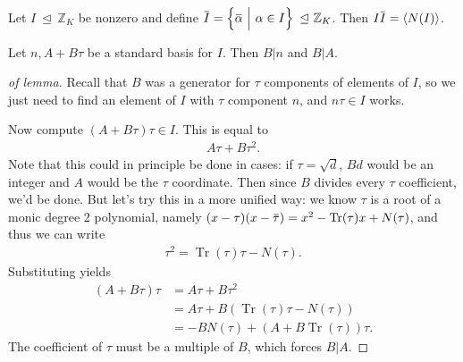 \begin{theorem}[?]

Let \(I {~\trianglelefteq~}{\mathbb{Z}}_K\) be nonzero and define
\(\mkern 1.5mu\overline{\mkern-1.5muI\mkern-1.5mu}\mkern 1.5mu = \left\{{ \mkern 1.5mu\overline{\mkern-1.5mu\alpha \mkern-1.5mu}\mkern 1.5mu{~\mathrel{\Big|}~}\alpha \in I }\right\} {~\trianglelefteq~}{\mathbb{Z}}_K\).
Then
\(I \mkern 1.5mu\overline{\mkern-1.5muI\mkern-1.5mu}\mkern 1.5mu = \left\langle{ N(I) }\right\rangle\).

\end{theorem}

\begin{lemma}[?]

Let \(n, A + B \tau\) be a standard basis for \(I\). Then
\(B\mathrel{\Big|}n\) and \(B\mathrel{\Big|}A\).

\end{lemma}

\begin{proof}[of lemma]

Recall that \(B\) was a generator for \(\tau\) components of elements of
\(I\), so we just need to find an element of \(I\) with \(\tau\)
component \(n\), and \(n \tau \in I\) works.

Now compute \((A + B \tau) \tau\in I\). This is equal to
\begin{align*}
A \tau + B \tau^2
.\end{align*}
Note that this could in principle be done in cases: if
\(\tau = \sqrt{d}\), \(Bd\) would be an integer and \(A\) would be the
\(\tau\) coordinate. Then since \(B\) divides every \(\tau\)
coefficient, we'd be done. But let's try this in a more unified way: we
know \(\tau\) is a root of a monic degree 2 polynomial, namely
\((x - \tau) (x - \mkern 1.5mu\overline{\mkern-1.5mu\tau\mkern-1.5mu}\mkern 1.5mu) = x^2 - \operatorname{Tr}( \tau)x + N( \tau)\),
and thus we can write
\begin{align*}
\tau^2 = \operatorname{Tr}( \tau) \tau - N( \tau)
.\end{align*}
Substituting yields
\begin{align*}
(A + B \tau) \tau
&= A \tau + B \tau^2 \\
&= A \tau + B ( \operatorname{Tr}( \tau) \tau - N( \tau) ) \\
&= - B N( \tau) + (A + B \operatorname{Tr}( \tau ) ) \tau
.\end{align*}
The coefficient of \(\tau\) must be a multiple of \(B\), which forces
\(B\mathrel{\Big|}A\).

\end{proof}

